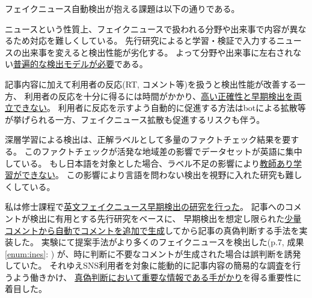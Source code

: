 フェイクニュース自動検出が抱える課題は以下の通りである。
\vspace{-3mm}
\begin{description}
    \setlength{\parskip}{0cm}
    \setlength{\itemsep}{0cm}
    \item[分野や出来事による特異性] %
        ニュースという性質上、フェイクニュースで扱われる分野や出来事で内容が異なるため対応を難しくしている。
        先行研究によると学習・検証で入力するニュースの出来事を変えると検出性能が劣化する\cite{Wang:2018:EEA:3219819.3219903}。
        よって分野や出来事に左右されない\underline{普遍的な検出モデルが必要}である。
    \item[早期検出と正確性の両立] %
        記事内容に加えて利用者の反応(RT, コメント等)を扱うと検出性能が改善する\cite{Wu:2018:TFF:3159652.3159677}一方、
        利用者の反応を十分に得るには時間がかかり、\underline{高い正確性と早期検出を両立できない}。
        利用者に反応を示すよう自動的に促進する方法はbotによる拡散等が挙げられる一方、フェイクニュース拡散も促進するリスクも伴う。
    \item[日本語データセット不足] %
        深層学習による検出は、正解ラベルとして多量のファクトチェック結果を要する。
        このファクトチェックが活発な地域差の影響でデータセットが英語に集中\cite{fakenewsnet}している。
        もし日本語を対象とした場合、ラベル不足の影響により\underline{教師あり学習ができない}。
        この影響により言語を問わない検出を視野に入れた研究も難しくしている。
    \end{description}

私は修士課程で\underline{英文フェイクニュース早期検出の研究を行った}。
記事へのコメントが検出に有用とする先行研究\cite{defend}をベースに、
早期検出を想定し限られた\underline{少量コメントから自動でコメントを追加で生成}してから記事の真偽判断する手法を実装した。
実験にて提案手法がより多くのフェイクニュースを検出した(p.7, 成果\ref{enum:ines}: \cite{ines})
が、時に判断に不要なコメントが生成された場合は誤判断を誘発していた。
それゆえSNS利用者を対象に能動的に記事内容の簡易的な調査を行うよう働きかけ、
\underline{真偽判断において重要な情報である手がかり}を得る重要性に着目した。

